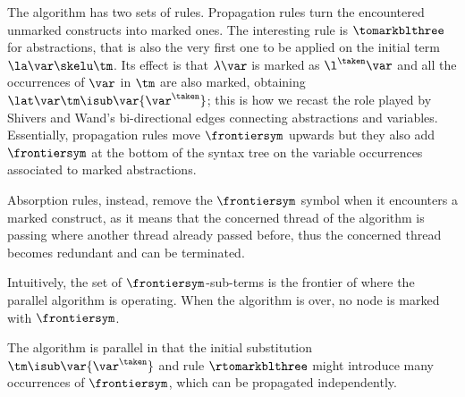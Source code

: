 The algorithm has two sets of rules. Propagation rules turn the encountered unmarked constructs into marked ones. The interesting rule is $\tomarkblthree$ for abstractions, that is also the very first one to be applied on the initial term $\la\var\skelu\tm$. Its effect is that $\lambda\var$ is marked as $\l^\taken\var$ and all the occurrences of $\var$ in $\tm$ are also marked, obtaining $\lat\var\tm\isub\var{\var^\taken}$; this is how we recast the role played by Shivers and Wand's bi-directional edges connecting abstractions and variables. Essentially, propagation rules move $\frontiersym$ upwards but they also add $\frontiersym$ at the bottom of the syntax tree on the variable occurrences associated to marked abstractions.

Absorption rules, instead, remove the $\frontiersym$ symbol when it encounters a marked construct, as it means that the concerned thread of the algorithm is passing where another thread already passed before, thus the concerned thread becomes redundant and can be terminated. 

Intuitively, the set of $\frontiersym$-sub-terms is the frontier of where the parallel algorithm is operating. When the algorithm is over, no node is marked with $\frontiersym$. 

The algorithm is parallel in that the initial substitution $\tm\isub\var{\var^\taken}$ and rule $\rtomarkblthree$ might introduce many occurrences of $\frontiersym$, which can be propagated independently.


